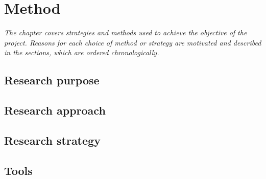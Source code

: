\chapter{Method}
\emph{The chapter covers strategies and methods used to achieve the objective of the project. Reasons for each choice of method or strategy are motivated and described in the sections, which are ordered chronologically.}



\section{Research purpose}
\section{Research approach}
\section{Research strategy}


\section{Tools}



